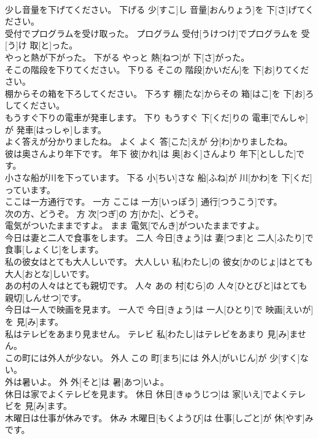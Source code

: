 \documentclass[8pt]{extreport}
\begin{document}
\begin{CJK}{UTF8}{min}
\\	少し音量を下げてください。	下げる	少[すこ]し 音量[おんりょう]を 下[さ]げてください。	
\\	受付でプログラムを受け取った。	プログラム	受付[うけつけ]でプログラムを 受[う]け 取[と]った。	
\\	やっと熱が下がった。	下がる	やっと 熱[ねつ]が 下[さ]がった。	
\\	そこの階段を下りてください。	下りる	そこの 階段[かいだん]を 下[お]りてください。	
\\	棚からその箱を下ろしてください。	下ろす	棚[たな]からその 箱[はこ]を 下[お]ろしてください。	
\\	もうすぐ下りの電車が発車します。	下り	もうすぐ 下[くだ]りの 電車[でんしゃ]が 発車[はっしゃ]します。	
\\	よく答えが分かりましたね。	よく	よく 答[こた]えが 分[わ]かりましたね。	
\\	彼は奥さんより年下です。	年下	彼[かれ]は 奥[おく]さんより 年下[としした]です。	
\\	小さな船が川を下っています。	下る	小[ちい]さな 船[ふね]が 川[かわ]を 下[くだ]っています。	
\\	ここは一方通行です。	一方	ここは 一方[いっぽう] 通行[つうこう]です。	
\\	次の方、どうぞ。	方	次[つぎ]の 方[かた]、どうぞ。	
\\	電気がついたままですよ。	まま	電気[でんき]がついたままですよ。	
\\	今日は妻と二人で食事をします。	二人	今日[きょう]は 妻[つま]と 二人[ふたり]で 食事[しょくじ]をします。	
\\	私の彼女はとても大人しいです。	大人しい	私[わたし]の 彼女[かのじょ]はとても 大人[おとな]しいです。	
\\	あの村の人々はとても親切です。	人々	あの 村[むら]の 人々[ひとびと]はとても 親切[しんせつ]です。	
\\	今日は一人で映画を見ます。	一人で	今日[きょう]は 一人[ひとり]で 映画[えいが]を 見[み]ます。	
\\	私はテレビをあまり見ません。	テレビ	私[わたし]はテレビをあまり 見[み]ません。	
\\	この町には外人が少ない。	外人	この 町[まち]には 外人[がいじん]が 少[すく]ない。	
\\	外は暑いよ。	外	外[そと]は 暑[あつ]いよ。	
\\	休日は家でよくテレビを見ます。	休日	休日[きゅうじつ]は 家[いえ]でよくテレビを 見[み]ます。	
\\	木曜日は仕事が休みです。	休み	木曜日[もくようび]は 仕事[しごと]が 休[やす]みです。	

\end{CJK}
\end{document}
